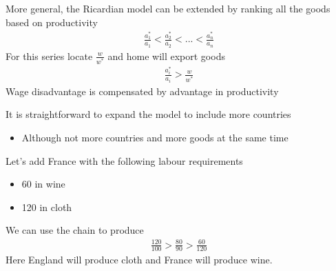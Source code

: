 \documentclass{beamer}
\begin{document}
\begin{frame}
  More general, the Ricardian model can be extended by ranking all the goods based on productivity
  \begin{align*}
    \frac{a_1^*}{a_1}<\frac{a_2^*}{a_2}<...<\frac{a_n^*}{a_n}
  \end{align*}
  \medskip
  For this series locate $\frac{w}{w^*}$ and home will export goods
  \begin{align*}
    \frac{a_i^*}{a_i}>\frac{w}{w^*}
  \end{align*}
  \medskip
  Wage disadvantage is compensated by advantage in productivity
\end{frame}

\begin{frame}
  It is straightforward to expand the model to include more countries
  \begin{itemize}
    \item Although not more countries and more goods at the same time
  \end{itemize}
  \medskip
  Let's add France with the following labour requirements
  \begin{itemize}
    \item 60 in wine
    \item 120 in cloth    
  \end{itemize}
  \medskip
  We can use the chain to produce
  \begin{align*}
    \frac{120}{100} > \frac{80}{90} > \frac{60}{120}
  \end{align*}
  \medskip
  Here England will produce cloth and France will produce wine.   
\end{frame}
\end{document}
